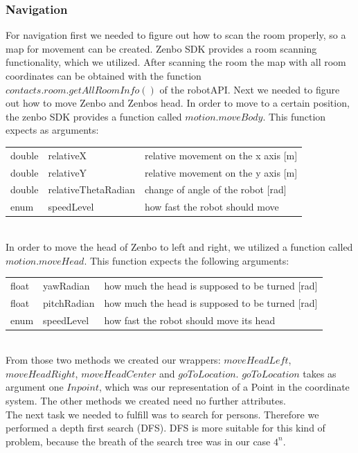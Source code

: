 \documentclass[conference]{IEEEtran}
\begin{document}
\subsubsection{Navigation}
For navigation first we needed to figure out how to scan the room properly, so 
a map for movement can be created. Zenbo SDK provides a room scanning functionality, which we utilized.
After scanning the room the map with all room coordinates can be obtained with the 
function $contacts.room.getAllRoomInfo()$ of the robotAPI.
Next we needed to figure out how to move Zenbo and Zenbos head. In order to move to a certain position, the zenbo SDK provides a function called $motion.moveBody$.
This function expects as arguments:
\begin{table}[h]
	\begin{tabular}{lll}
		double & relativeX           & relative movement on the x axis [m] \\
		double & relativeY           & relative movement on the y axis [m] \\
		double & relativeThetaRadian & change of angle of the robot [rad]  \\
		enum   & speedLevel          & how fast the robot should move      
	\end{tabular}
\end{table}\\
In order to move the head of Zenbo to left and right, we utilized a function called $motion.moveHead$.
This function expects the following arguments: 
\begin{table}[h]
	\begin{tabular}{lll}
		float & yawRadian   & how much the head is supposed to be turned [rad] \\
		float & pitchRadian & how much the head is supposed to be turned [rad] \\
		enum  & speedLevel  & how fast the robot should move  its head         
	\end{tabular}
\end{table}\\
From those two methods we created our wrappers: $moveHeadLeft$, $moveHeadRight$, $moveHeadCenter$ 
and $goToLocation$.
$goToLocation$ takes as argument one $Inpoint$, which was our representation of a Point in the coordinate system.
The other methods we created need no further attributes.\\
The next task we needed to fulfill was to search for persons. Therefore we performed a depth first search (DFS).
DFS is more suitable for this kind of problem, because the breath of the search tree was in our case $4^n$.
\end{document}
